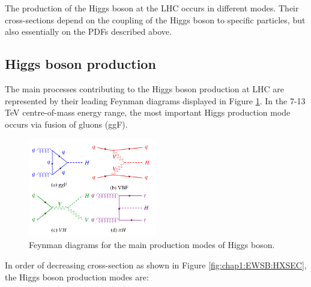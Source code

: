 The production of the Higgs boson at the LHC occurs in different modes. Their cross-sections depend on the coupling of the Higgs boson to specific particles, but also essentially on the PDFs described above.

\subsection{Higgs boson production}
\label{chap1:EWSB:HP}
The main processes contributing to the Higgs boson production at LHC are represented by their leading Feynman diagrams displayed in Figure \ref{fig:chap1:EWSB:HP}. In the 7-13 TeV centre-of-mass energy range, the most important Higgs production mode occurs via fusion of gluons (ggF). 
\begin{figure}[htbp]
    \centering
    \includegraphics[width=0.5\textwidth]{Ch1/Img/Higgs_prod_modes.png}
    \caption{Feynman diagrams for the main production modes of Higgs boson.}
    \label{fig:chap1:EWSB:HP}
\end{figure}
In order of decreasing cross-section as shown in Figure \ref{fig:chap1:EWSB:HXSEC}, the Higgs boson production modes are:
